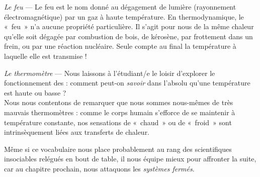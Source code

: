 \begin{description}
			\item \textit{Le feu} --- Le feu est le nom donné au dégagement de lumière (rayonnement électromagnétique) par un gaz à haute température. En thermodynamique, le «~feu~» n’a aucune propriété particulière. Il s’agit pour nous de la même chaleur qu’elle soit dégagée par combustion de bois, de kérosène, par frottement dans un frein, ou par une réaction nucléaire. Seule compte au final la température à laquelle elle est transmise !
			\item \textit{Le thermomètre} --- Nous laissons à l’étudiant/e le loisir d’explorer le fonctionnement des  : comment peut-on \emph{savoir} dans l’absolu qu’une température est haute ou basse ?\\
				Nous nous contentons de remarquer que nous sommes nous-mêmes de très mauvais thermomètres : comme le corps humain s’efforce de se maintenir à température constante, nos sensations de «~chaud~» ou de «~froid~» sont intrinsèquement liées aux transferts de chaleur.

		\end{description}
		
	Même si ce vocabulaire nous place probablement au rang des scientifiques insociables relégués en bout de table, il nous équipe mieux pour affronter la suite, car au chapitre prochain, nous attaquons les \textit{systèmes fermés}.

